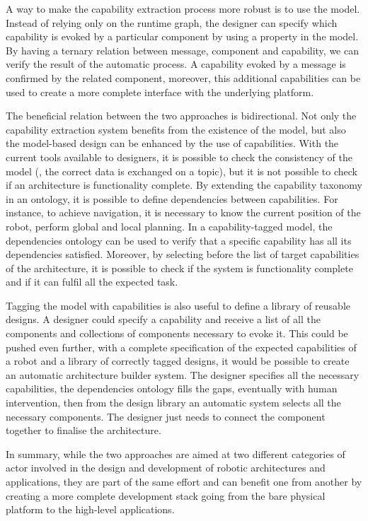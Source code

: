 A way to make the capability extraction process more robust is to use the model. Instead of relying only on the runtime graph, the designer can specify which capability is evoked by a particular component by using a property in the model. By having a ternary relation between message, component and capability, we can verify the result of the automatic process. A capability evoked by a message is confirmed by the related component, moreover, this additional capabilities can be used to create a more complete interface with the underlying platform.

The beneficial relation between the two approaches is bidirectional. Not only the capability extraction system benefits from the existence of the model, but also the model-based design can be enhanced by the use of capabilities. With the current tools available to designers, it is possible to check the consistency of the model (\eg, the correct data is exchanged on a topic), but it is not possible to check if an architecture is functionality complete. By extending the capability taxonomy in an ontology, it is possible to define dependencies between capabilities. For instance, to achieve navigation, it is necessary to know the current position of the robot, perform global and local planning. In a capability-tagged model, the dependencies ontology can be used to verify that a specific capability has all its dependencies satisfied. Moreover, by selecting before the list of target capabilities of the architecture, it is possible to check if the system is functionality complete and if it can fulfil all the expected task.

Tagging the model with capabilities is also useful to define a library of reusable designs. A designer could specify a capability and receive a list of all the components and collections of components necessary to evoke it. This could be pushed even further, with a complete specification of the expected capabilities of a robot and a library of correctly tagged designs, it would be possible to create an automatic architecture builder system. The designer specifies all the necessary capabilities, the dependencies ontology fills the gaps, eventually with human intervention, then from the design library an automatic system selects all the necessary components. The designer just needs to connect the component together to finalise the architecture.

In summary, while the two approaches are aimed at two different categories of actor involved in the design and development of robotic architectures and applications, they are part of the same effort and can benefit one from another by creating a more complete development stack going from the bare physical platform to the high-level applications. 

